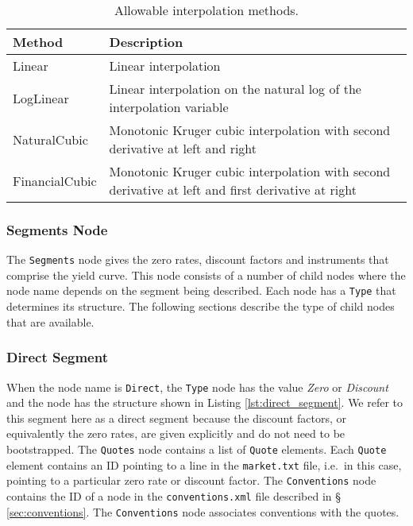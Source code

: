 \begin{table}[h]
\centering
  \begin{tabu} to 0.9\linewidth {| X[-1.5,l,m] | X[-5,l,m] |}
    \hline
    \bfseries{Method} & \bfseries{Description} \\
    \hline
    Linear & Linear interpolation \\ \hline
    LogLinear & Linear interpolation on the natural log of the interpolation variable \\ \hline
    NaturalCubic & Monotonic Kruger cubic interpolation with second derivative at left and right \\ \hline
    FinancialCubic & Monotonic Kruger cubic interpolation with second derivative at left and 
                     first derivative at right \\ \hline
  \end{tabu}
  \caption{Allowable interpolation methods.}
  \label{tab:allow_interp_methods}
\end{table}
\subsubsection*{Segments Node} \label{ss:segments_node}
The \lstinline!Segments! node gives the zero rates, discount factors and instruments that comprise the yield curve. This 
node consists of a number of child nodes where the node name depends on the segment being described. Each node has a 
\lstinline!Type! that determines its structure. The following sections describe the type of child nodes that are 
available.

\subsubsection*{Direct Segment}
When the node name is \lstinline!Direct!, the \lstinline!Type! node has the value \emph{Zero} or \emph{Discount} and the 
node has the structure shown in Listing \ref{lst:direct_segment}. We refer to this segment here as a direct segment 
because the discount factors, or equivalently the zero rates, are given explicitly and do not need to be bootstrapped. The 
\lstinline!Quotes! node contains a list of \lstinline!Quote! elements. Each \lstinline!Quote! element contains an ID 
pointing to a line in the {\tt market.txt} file, i.e.\ in this case, pointing to a particular zero rate or discount 
factor. The \lstinline!Conventions! node contains the ID of a node in the {\tt conventions.xml} file described in \S 
\ref{sec:conventions}. The \lstinline!Conventions! node associates conventions with the quotes.

